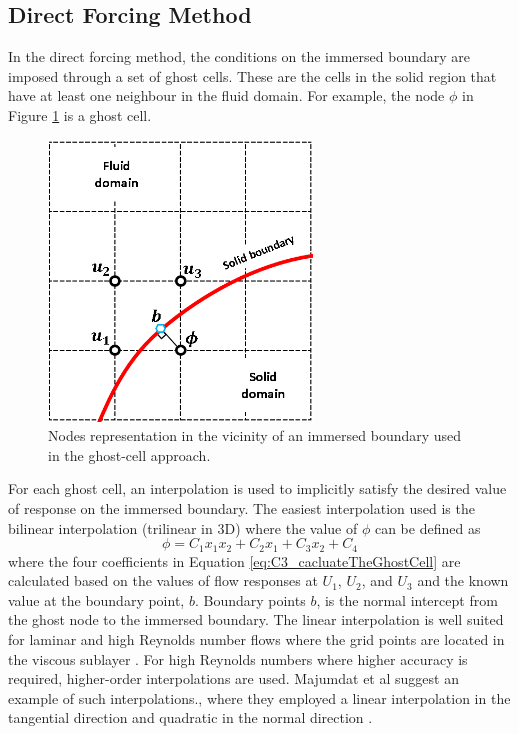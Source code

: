 \subsection{Direct Forcing Method}
In the direct forcing method, the conditions on the immersed boundary are imposed through a set of ghost cells. These are the cells in the solid region that have at least one neighbour in the fluid domain. For example, the node $\phi$ in Figure \ref{fig:C3_ghostCell} is a ghost cell.
%
\begin{figure}[H]
    \centering
    \includegraphics[width=7.00cm]{Chapter_3/figure/discrete_forcing_approach.png}
    \caption{Nodes representation in the vicinity of an immersed boundary used in the ghost-cell approach.}
    \label{fig:C3_ghostCell}
\end{figure}
%
For each ghost cell, an interpolation is used to implicitly satisfy the desired value of response on the immersed boundary. The easiest interpolation used is the bilinear interpolation (trilinear in 3D) where the value of $\phi$ can be defined as
%
\begin{equation}\label{eq:C3_cacluateTheGhostCell}
    \phi = C_1 x_1 x_2 + C_2 x_1 + C_3 x_2 + C_4
\end{equation}
%
where the four coefficients in Equation \eqref{eq:C3_cacluateTheGhostCell} are calculated based on the values of flow responses at $U_1$, $U_2$, and $U_3$ and the known value at the boundary point, $b$. Boundary points $b$, is the normal intercept from the ghost node to the immersed boundary. The linear interpolation is well suited for laminar and high Reynolds number flows where the grid points are located in the viscous sublayer \cite{iaccarino2003immersed}. For high Reynolds numbers where higher accuracy is required, higher-order interpolations are used. Majumdat et al suggest an example of such interpolations., where they employed a linear interpolation in the tangential direction and quadratic in the normal direction \cite{majumdar2001rans}. 

